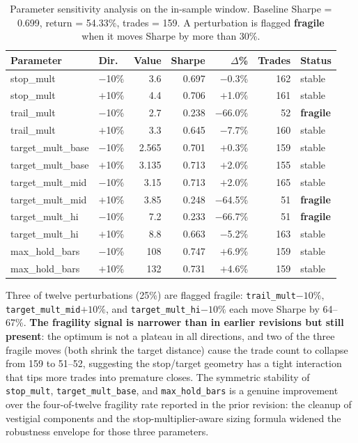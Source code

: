 \documentclass{article}
\begin{document}
\begin{table}[h]
\centering
\caption{Parameter sensitivity analysis on the in-sample window. Baseline Sharpe = 0.699, return = 54.33\%, trades = 159. A perturbation is flagged \textbf{fragile} when it moves Sharpe by more than 30\%.}
\label{tab:param_sens}
\small
\begin{tabular}{@{}llrrrrl@{}}
\toprule
\textbf{Parameter} & \textbf{Dir.} & \textbf{Value} & \textbf{Sharpe} & \textbf{$\Delta$\%} & \textbf{Trades} & \textbf{Status} \\
\midrule
stop\_mult        & $-$10\% & 3.6   & 0.697 & $-$0.3\%  & 162 & stable \\
stop\_mult        & $+$10\% & 4.4   & 0.706 & $+$1.0\%  & 161 & stable \\
trail\_mult       & $-$10\% & 2.7   & 0.238 & $-$66.0\% & \phantom{0}52 & \textbf{fragile} \\
trail\_mult       & $+$10\% & 3.3   & 0.645 & $-$7.7\%  & 160 & stable \\
target\_mult\_base & $-$10\% & 2.565 & 0.701 & $+$0.3\%  & 159 & stable \\
target\_mult\_base & $+$10\% & 3.135 & 0.713 & $+$2.0\%  & 155 & stable \\
target\_mult\_mid  & $-$10\% & 3.15  & 0.713 & $+$2.0\%  & 165 & stable \\
target\_mult\_mid  & $+$10\% & 3.85  & 0.248 & $-$64.5\% & \phantom{0}51 & \textbf{fragile} \\
target\_mult\_hi   & $-$10\% & 7.2   & 0.233 & $-$66.7\% & \phantom{0}51 & \textbf{fragile} \\
target\_mult\_hi   & $+$10\% & 8.8   & 0.663 & $-$5.2\%  & 163 & stable \\
max\_hold\_bars    & $-$10\% & 108   & 0.747 & $+$6.9\%  & 159 & stable \\
max\_hold\_bars    & $+$10\% & 132   & 0.731 & $+$4.6\%  & 159 & stable \\
\bottomrule
\end{tabular}
\end{table}

Three of twelve perturbations (25\%) are flagged fragile: \texttt{trail\_mult}$-10\%$, \texttt{target\_mult\_mid}$+10\%$, and \texttt{target\_mult\_hi}$-10\%$ each move Sharpe by 64--67\%.
\textbf{The fragility signal is narrower than in earlier revisions but still present}: the optimum is not a plateau in all directions, and two of the three fragile moves (both shrink the target distance) cause the trade count to collapse from 159 to 51--52, suggesting the stop/target geometry has a tight interaction that tips more trades into premature closes.
The symmetric stability of \texttt{stop\_mult}, \texttt{target\_mult\_base}, and \texttt{max\_hold\_bars} is a genuine improvement over the four-of-twelve fragility rate reported in the prior revision: the cleanup of vestigial components and the stop-multiplier-aware sizing formula widened the robustness envelope for those three parameters.
\end{document}
